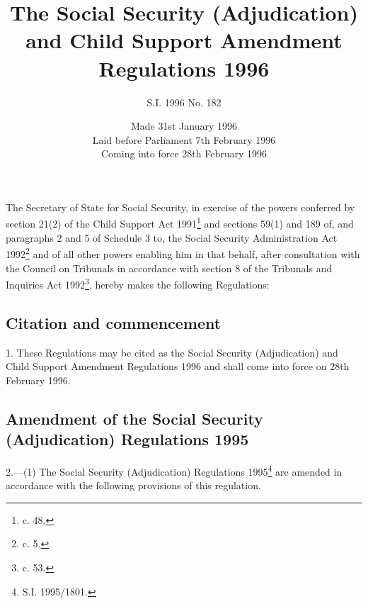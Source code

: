 \documentclass[a4paper]{article}
\title{The Social Security (Adjudication) and Child Support Amendment Regulations 1996}
\author{S.I. 1996 No. 182}
\date{Made 31st January 1996\\Laid before Parliament 7th February 1996\\Coming into force 28th February 1996
}
\begin{document}
\maketitle

\noindent
The Secretary of State for Social Security, in exercise of the powers conferred by section 21(2) of the Child Support Act 1991\footnote{ c. 48.} and sections 59(1) and 189 of, and paragraphs 2 and 5 of Schedule 3 to, the Social Security Administration Act 1992\footnote{ c. 5.} and of all other powers enabling him in that behalf, after consultation with the Council on Tribunals in accordance with section 8 of the Tribunals and Inquiries Act 1992\footnote{ c. 53.}, hereby makes the following Regulations:

{\sloppy

\tableofcontents

}

\setcounter{secnumdepth}{-2}

\subsection[1. Citation and commencement]{Citation and commencement}

1.  These Regulations may be cited as the Social Security (Adjudication) and Child Support Amendment Regulations 1996 and shall come into force on 28th February 1996.

\subsection[2. Amendment of the Social Security (Adjudication) Regulations 1995]{Amendment of the Social Security (Adjudication) Regulations 1995}

2.—(1) The Social Security (Adjudication) Regulations 1995\footnote{\frenchspacing S.I. 1995/1801.} are amended in accordance with the following provisions of this regulation.
\end{document}
